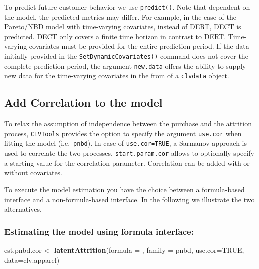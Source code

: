 \documentclass[
]{article}
\newenvironment{Shaded}{\begin{snugshade}}{\end{snugshade}}
\newcommand{\AttributeTok}[1]{\textcolor[rgb]{0.13,0.29,0.53}{#1}}
\newcommand{\ConstantTok}[1]{\textcolor[rgb]{0.56,0.35,0.01}{#1}}
\newcommand{\FunctionTok}[1]{\textcolor[rgb]{0.13,0.29,0.53}{\textbf{#1}}}
\newcommand{\NormalTok}[1]{#1}
\newcommand{\OtherTok}[1]{\textcolor[rgb]{0.56,0.35,0.01}{#1}}
\begin{document}
To predict future customer behavior we use \texttt{predict()}. Note that
dependent on the model, the predicted metrics may differ. For example,
in the case of the Pareto/NBD model with time-varying covariates,
instead of DERT, DECT is predicted. DECT only covers a finite time
horizon in contrast to DERT. Time-varying covariates must be provided
for the entire prediction period. If the data initially provided in the
\texttt{SetDynamicCovariates()} command does not cover the complete
prediction period, the argument \texttt{new.data} offers the ability to
supply new data for the time-varying covariates in the from of a
\texttt{clvdata} object.

\subsection{Add Correlation to the
model}\label{add-correlation-to-the-model}

To relax the assumption of independence between the purchase and the
attrition process, \texttt{CLVTools} provides the option to specify the
argument \texttt{use.cor} when fitting the model (i.e.~\texttt{pnbd}).
In case of \texttt{use.cor=TRUE}, a Sarmanov approach is used to
correlate the two processes. \texttt{start.param.cor} allows to
optionally specify a starting value for the correlation parameter.
Correlation can be added with or without covariates.

To execute the model estimation you have the choice between a
formula-based interface and a non-formula-based interface. In the
following we illustrate the two alternatives.

\subsubsection{\texorpdfstring{\textbf{Estimating the model using
formula
interface:}}{Estimating the model using formula interface:}}\label{estimating-the-model-using-formula-interface-3}

\begin{Shaded}
\begin{Highlighting}[]
\NormalTok{est.pnbd.cor }\OtherTok{\textless{}{-}} \FunctionTok{latentAttrition}\NormalTok{(}\AttributeTok{formula =}\NormalTok{ , }\AttributeTok{family =}\NormalTok{ pnbd, }
                                \AttributeTok{use.cor=}\ConstantTok{TRUE}\NormalTok{, }\AttributeTok{data=}\NormalTok{clv.apparel)}
\end{Highlighting}
\end{Shaded}
\end{document}
